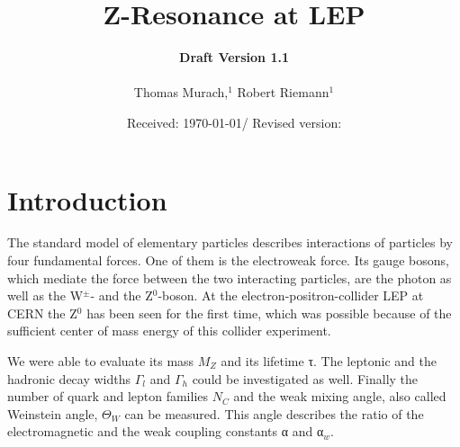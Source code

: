 \documentclass[epj,nopacs]{svjour}
\begin{document}
\hugehead

\newcommand{\dd}[1]{\mathrm{d}#1\,} %
\newcommand{\lref}[1]{listing (\ref{lst:#1})} %
\newcommand{\fref}[1]{fig. (\ref{fig:#1})} %
\newcommand{\tref}[1]{tab. (\ref{tab:#1})} %
\newcommand{\eref}[1]{eq. (\ref{eqn:#1})} %

\title{Z-Resonance at LEP}
\author{{\bf Draft Version 1.1}\\
\medskip \\
Thomas Murach,$^{1}$
Robert Riemann$^{1}$
} 
\date{Received: \today / Revised version:}
\maketitle

\vspace*{-1.5cm}
\section{ Introduction}
\baselineskip=0.38cm
\vspace*{1.cm}

The standard model of elementary particles describes interactions of particles
by four fundamental forces. One of them is the electroweak force. Its gauge
bosons, which mediate the force between the two interacting particles, are the
photon as well as the W$^{\pm}$- and the Z$^0$-boson. At the
electron-positron-collider LEP at CERN the Z$^0$ has been seen for the first
time, which was possible because of the sufficient center of mass energy of this
collider experiment.

We were able to evaluate its mass $M_Z$ and its lifetime τ. The leptonic and
the hadronic decay widths $Γ_l$ and $Γ_h$ could be investigated as well. Finally
the number of quark and lepton families $N_C$ and the weak mixing angle, also
called Weinstein angle, $\Theta_W$ can be measured. This angle describes the
ratio of the electromagnetic and the weak coupling constants α and α$_w$.
\end{document}
